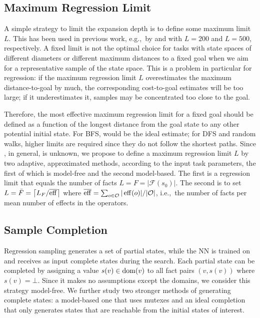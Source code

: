 \subsection{Maximum Regression Limit}
\label{sec:rollout-depth-limit}

A simple strategy to limit the expansion depth is to define some maximum limit $L$. This has been used in previous work, e.g.,~by \citeyear{Yu.etal/2020} and \citeyear{OToole/2022} with $L=200$ and $L=500$, respectively. A fixed limit is not the optimal choice for tasks with state spaces of different diameters or different maximum distances to a fixed goal when we aim for a representative sample of the state space. This is a problem in particular for regression: if the maximum regression limit $L$ overestimates the maximum distance-to-goal by much, the corresponding cost-to-goal estimates will be too large; if it underestimates it, samples may be concentrated too close to the goal.

Therefore, the most effective maximum regression limit for a fixed goal should be defined as a function of the longest distance \distfarthest from the goal state to any other potential initial state. For BFS, \distfarthest would be the ideal estimate; for DFS and random walks, higher limits are required since they do not follow the shortest paths. Since \distfarthest, in general, is unknown, we propose to define a maximum regression limit $L$ by two adaptive, approximated methods, according to the input task parameters, the first of which is model-free and the second model-based. The first is a regression limit that equals the number of facts $L=F=|\mathcal{F}(s_0)|$. The second is to set $L=\bar F=\left\lceil L_F/\overline{\operatorname{eff}}\right\rceil$ where $\overline{\operatorname{eff}}=\sum_{o\in \mathcal{O}} |\operatorname{eff}(o)|/|\mathcal{O}|$, i.e.,~the number of facts per mean number of effects in the operators.

\subsection{Sample Completion}
\label{sec:sample-completion}

Regression sampling generates a set of partial states, while the NN is trained on and receives as input complete states during the search. Each partial state can be completed by assigning a value $s(v)\in\operatorname{dom}(v)$ to all fact pairs $(v,s(v))$ where $s(v)=\bot$. Since it makes no assumptions except the domains, we consider this strategy model-free. We further study two stronger methods of generating complete states: a model-based one that uses mutexes and an ideal completion that only generates states that are reachable from the initial states of interest.

